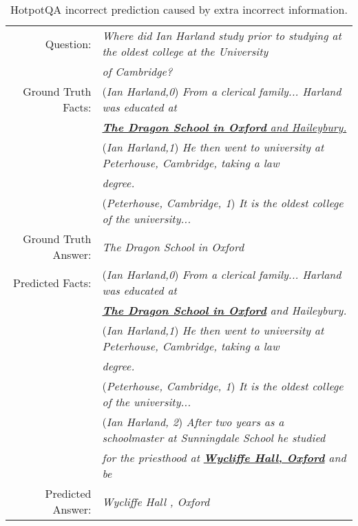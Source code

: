 \documentclass[11pt,a4paper]{article}
\begin{document}
\begin{table*}[t]
\centering
\small
\begin{tabular}{rl}
\toprule
Question: & \textit{Where did Ian Harland study prior to studying at the oldest college at the University}\\ & \textit{of Cambridge?}\\
\midrule

Ground Truth Facts: & (\textit{Ian Harland,0}) \textit{From a clerical family... Harland was educated at}\\ &  \textit{\underline{\textbf{The Dragon School in Oxford} and Haileybury.}}\\
 & (\textit{Ian Harland,1}) \textit{He then went to university at Peterhouse, Cambridge, taking a law}\\ &  \textit{degree.}\\
 & (\textit{Peterhouse, Cambridge, 1}) \textit{It is the oldest college of the university...}\\
 
Ground Truth Answer: & \textit{The Dragon School in Oxford}\\
\midrule
Predicted Facts: & (\textit{Ian Harland,0}) \textit{From a clerical family... Harland was educated at}\\ &  \textit{\underline{\textbf{The Dragon School in Oxford}} and Haileybury.}\\
 & (\textit{Ian Harland,1}) \textit{He then went to university at Peterhouse, Cambridge, taking a law}\\ &  \textit{degree.}\\
 & (\textit{Peterhouse, Cambridge, 1}) \textit{It is the oldest college of the university...}\\
  & (\textit{Ian Harland, 2}) \textit{After two years as a schoolmaster at Sunningdale School he studied}\\ &  \textit{for the priesthood at \underline{\textbf{Wycliffe Hall, Oxford}} and be}\\
Predicted Answer: & \textit{Wycliffe Hall , Oxford}\\
\bottomrule
\end{tabular}
\caption{HotpotQA incorrect prediction caused by extra incorrect information.}
\label{table:ranker_analysis_2}
\end{table*}
\end{document}
